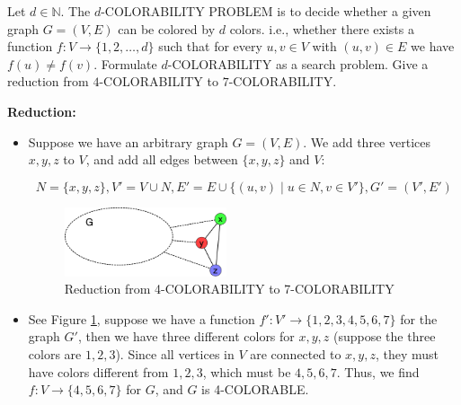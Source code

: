 \documentclass{article}
\newcounter{exercise}
\newcommand{\<}{
    \langle}
\renewcommand{\>}{
    \rangle}
\begin{document}
{\newpage

\begin{exercise}
Let $d\in \mathbb{N}$. The $d$-\textsf{COLORABILITY PROBLEM} is to decide whether a given graph $G=(V,E)$ can be colored by $d$ colors. i.e., whether there exists a function $f:V\rightarrow \{1,2,\ldots,d\}$ such that for every $u,v\in V$ with $(u,v)\in E$ we have $f(u)\neq f(v)$. Formulate  $d$-\textsf{COLORABILITY} as a search problem. Give a reduction from $4$-\textsc{COLORABILITY} to $7$-\textsc{COLORABILITY}.
\end{exercise}

\leavevmode\newline

\textbf{Reduction:} 
\begin{itemize}
\item Suppose we have an arbitrary graph $G=(V,E)$. We add three vertices $x,y,z$ to $V$, and add all edges between $\{x,y,z\}$ and $V$:

\begin{displaymath} 
    N=\{x,y,z\},V'=V\cup N, E'=E\cup \{(u,v)\mid u\in N, v \in V'\},G'=(V',E')
\end{displaymath}

\begin{figure}[!htp]
    \centering
    \includegraphics[width=0.45\textwidth]{img/6.jpg}
    \caption{Reduction from 4-COLORABILITY to 7-COLORABILITY}
    \label{ggg}
\end{figure}

\item See Figure \ref{ggg}, suppose we have a function $f':V'\rightarrow \{1,2,3,4,5,6,7\}$ for the graph $G'$, then we have three different colors for $x,y,z$ (suppose the three colors are $1,2,3$). Since all vertices in $V$ are connected to $x,y,z$, they must have colors different from $1,2,3$, which must be $4,5,6,7$. Thus, we find $f:V\rightarrow \{4,5,6,7\}$ for $G$, and $G$ is 4-COLORABLE.

\end{itemize}

\newpage


}
\end{document}

